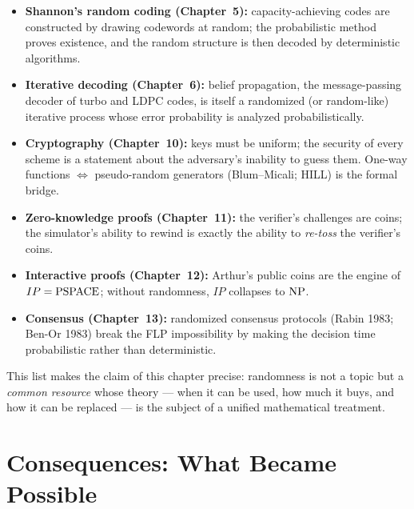 \begin{itemize}
\item \textbf{Shannon's random coding (Chapter~5):} capacity-achieving codes are constructed by drawing codewords at random; the probabilistic method proves existence, and the random structure is then decoded by deterministic algorithms.
\item \textbf{Iterative decoding (Chapter~6):} belief propagation, the message-passing decoder of turbo and LDPC codes, is itself a randomized (or random-like) iterative process whose error probability is analyzed probabilistically.
\item \textbf{Cryptography (Chapter~10):} keys must be uniform; the security of every scheme is a statement about the adversary's inability to guess them. One-way functions $\iff$ pseudo-random generators (Blum--Micali; HILL) is the formal bridge.
\item \textbf{Zero-knowledge proofs (Chapter~11):} the verifier's challenges are coins; the simulator's ability to rewind is exactly the ability to \emph{re-toss} the verifier's coins.
\item \textbf{Interactive proofs (Chapter~12):} Arthur's public coins are the engine of $IP = \text{PSPACE}$; without randomness, $IP$ collapses to $\text{NP}$.
\item \textbf{Consensus (Chapter~13):} randomized consensus protocols (Rabin 1983; Ben-Or 1983) break the FLP impossibility by making the decision time probabilistic rather than deterministic.
\end{itemize}

This list makes the claim of this chapter precise: randomness is not a topic but a \emph{common resource} whose theory --- when it can be used, how much it buys, and how it can be replaced --- is the subject of a unified mathematical treatment.

\section{Consequences: What Became Possible}
\label{sec:randomized:consequences}

